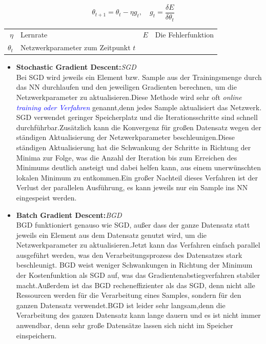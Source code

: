\documentclass[12pt,a4paper]{scrartcl}
\numberwithin{equation}{section}
\begin{document}
\begin{equation}\label{GD}
	\theta_{t+1} = \theta_{t} -\eta g_{t}, \quad g_t=\frac{\delta E}{\delta \theta_{t}}
\end{equation}
\begin{center}
	\begin{tabular}{r@{: }l r@{: }l}
	 $ \eta$& Lernrate & $ E$ & Die Fehlerfunktion\\
	 $ \theta_{t} $& Netzwerkparameter zum Zeitpunkt $ t $
	\end{tabular}
\end{center}
\begin{itemize}
	\item \textbf{Stochastic Gradient Descent:}\textit{SGD}\\
		Bei SGD wird jeweils ein Element bzw. Sample aus der Trainingsmenge durch das \ac{NN} durchlaufen und den jeweiligen Gradienten berechnen, um die Netzwerkparameter zu aktualisieren.Diese Methode wird sehr oft \textit{online \textcolor{blue}{training oder Verfahren}} genannt,denn jedes Sample aktualisiert das Netzwerk. SGD verwendet geringer Speicherplatz und die Iterationsschritte sind schnell durchführbar.Zusätzlich kann die Konvergenz für großen Datensatz wegen der ständigen Aktualisierung der Netzwerkparameter beschleunigen.Diese ständigen Aktualisierung hat die Schwankung der Schritte in Richtung der Minima zur Folge, was die Anzahl der Iteration bis zum Erreichen des Minimums deutlich ansteigt und dabei helfen kann, aus einem unerwünschten lokalen Minimum zu entkommen.Ein großer Nachteil dieses Verfahren ist der Verlust der parallelen Ausführung, es kann jeweils nur ein Sample ins \ac{NN} eingespeist werden.
	\item \textbf{Batch Gradient Descent:}\textit{BGD}\\
		BGD funktioniert genauso wie SGD, außer dass der ganze Datensatz statt jeweils ein Element aus dem Datensatz genutzt wird, um die Netzwerkparameter zu aktualisieren.Jetzt kann das Verfahren einfach parallel ausgeführt werden, was den Verarbeitungsprozess des Datensatzes stark beschleunigt. BGD weist weniger Schwankungen in Richtung der Minimum der Kostenfunktion als SGD auf, was das Gradientenabstiegverfahren stabiler macht.Außerdem ist das BGD recheneffizienter als das SGD, denn nicht alle Ressourcen werden für die Verarbeitung eines Samples, sondern für den ganzen Datensatz verwendet.BGD ist leider sehr langsam,denn die Verarbeitung des ganzen Datensatz kann lange dauern und es ist nicht immer anwendbar, denn sehr große Datensätze lassen sich nicht im Speicher einspeichern.

\end{itemize}
\end{document}
